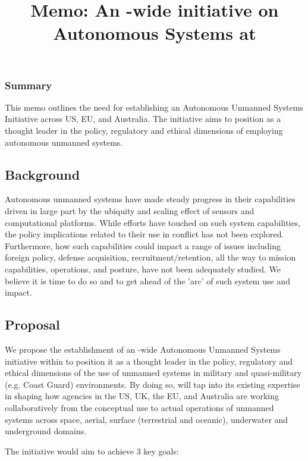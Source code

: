 \documentclass[11pt,letterpaper]{article}
\title{Memo: An \auke-wide initiative on Autonomous Systems at \org}
\begin{document}
\maketitle{}

\subsubsection{Summary}

This memo outlines the need for establishing an Autonomous Unmanned Systems Initiative across \org US, EU, and Australia. The initiative aims to position \org as a thought leader in the policy, regulatory and ethical dimensions of employing autonomous unmanned systems.

\subsection{Background}

Autonomous unmanned systems have made steady progress in their capabilities driven in large part by the ubiquity and scaling effect of sensors and computational platforms. While \org efforts have touched on such system capabilities, the policy implications related to their use in conflict has not been explored. Furthermore, how such capabilities could impact a range of issues including foreign policy, defense acquisition, recruitment/retention, all the way to mission capabilities, operations, and posture, have not been adequately studied. We believe it is time to do so and to get ahead of the ’arc’ of such system use and impact.


\subsection{Proposal}

We propose the establishment of an \auke-wide Autonomous Unmanned Systems initiative within \org to position it as a thought leader in the policy, regulatory and ethical dimensions of the use of unmanned systems in military and quasi-military (e.g. Coast Guard) environments. By doing so, \org will tap into its existing expertise in shaping how agencies in the US, UK, the EU, and Australia are working collaboratively from the conceptual use to actual operations of unmanned systems across space, aerial, surface (terrestrial and oceanic), underwater and underground domains.

The initiative would aim to achieve 3 key goals: 
\end{document}
